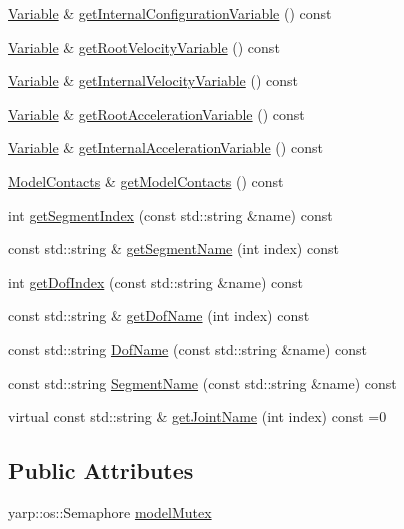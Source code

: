 \begin{DoxyCompactItemize}
\item 
\hyperlink{classocra_1_1Variable}{Variable} \& \hyperlink{classocra_1_1Model_a3f3c805565fb7ad4fa7289965ffa4b38}{get\+Internal\+Configuration\+Variable} () const 
\item 
\hyperlink{classocra_1_1Variable}{Variable} \& \hyperlink{classocra_1_1Model_a0f17230549e8e157002c37efe67bee2c}{get\+Root\+Velocity\+Variable} () const 
\item 
\hyperlink{classocra_1_1Variable}{Variable} \& \hyperlink{classocra_1_1Model_a92e1a9c91b43cee9b97b4fac928a1536}{get\+Internal\+Velocity\+Variable} () const 
\item 
\hyperlink{classocra_1_1Variable}{Variable} \& \hyperlink{classocra_1_1Model_a3c8143432903f04f898644147acb7702}{get\+Root\+Acceleration\+Variable} () const 
\item 
\hyperlink{classocra_1_1Variable}{Variable} \& \hyperlink{classocra_1_1Model_ab7568bcbff9e35473fd9e92a2f028789}{get\+Internal\+Acceleration\+Variable} () const 
\item 
\hyperlink{classocra_1_1ModelContacts}{Model\+Contacts} \& \hyperlink{classocra_1_1Model_a29d516e311f7fdd8217185f86260c044}{get\+Model\+Contacts} () const 
\item 
int \hyperlink{classocra_1_1Model_ad70550ba8cb5a50efac20f5c845cbf98}{get\+Segment\+Index} (const std\+::string \&name) const 
\item 
const std\+::string \& \hyperlink{classocra_1_1Model_a4d187f3375fe0f00397f551dd5ecf45a}{get\+Segment\+Name} (int index) const 
\item 
int \hyperlink{classocra_1_1Model_a197c69f42d1722a2e804e58a36457dfb}{get\+Dof\+Index} (const std\+::string \&name) const 
\item 
const std\+::string \& \hyperlink{classocra_1_1Model_ac7e343b2ee6debd1985a5c2028c2cb7e}{get\+Dof\+Name} (int index) const 
\item 
const std\+::string \hyperlink{classocra_1_1Model_a3e42a1d8e7bc2601f77786662d0540e6}{Dof\+Name} (const std\+::string \&name) const 
\item 
const std\+::string \hyperlink{classocra_1_1Model_a9adc98011d96ae1db9de7a478dcc7892}{Segment\+Name} (const std\+::string \&name) const 
\item 
virtual const std\+::string \& \hyperlink{classocra_1_1Model_ac88c445f37e5bf7302aa19b8e986013b}{get\+Joint\+Name} (int index) const =0
\end{DoxyCompactItemize}
\subsection*{Public Attributes}
\begin{DoxyCompactItemize}
\item 
yarp\+::os\+::\+Semaphore \hyperlink{classocra_1_1Model_a45b4c8b4b6480355f2abb06bb55f7146}{model\+Mutex}
\end{DoxyCompactItemize}
